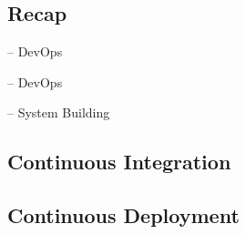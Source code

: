 
\subsection{Recap}
\begin{frame}{\insertsubsection{} -- DevOps \mytitlesource{\handbuch}}
	\frameDevOps
\end{frame}

\begin{frame}{\insertsubsection{} -- DevOps}
	\centering{}
\end{frame}

\begin{frame}{\insertsubsection{} -- System Building \mytitlesource{\sommerville}}
	\frameSystemBuilding
\end{frame}

\subsection{Continuous Integration}
\begin{frame}{\insertsubsection{} \mytitlesource{\sommerville}}
	\frameContinousIntegration
\end{frame}

\slidecicd{}

\subsection{Continuous Deployment}



